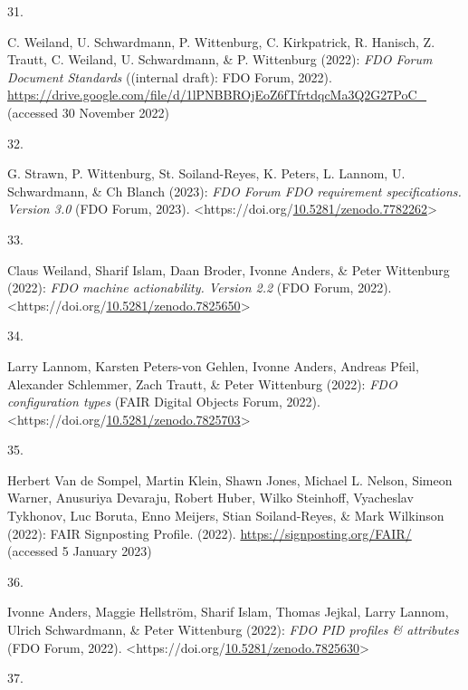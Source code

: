 \begin{thebibliography}{9}
\hypertarget{ref-fdo-DocProcessStd}{}
31.

C. Weiland, U. Schwardmann, P. Wittenburg, C. Kirkpatrick, R. Hanisch,
Z. Trautt, C. Weiland, U. Schwardmann, \& P. Wittenburg (2022):
\emph{{FDO Forum Document Standards}} ({(internal draft)}: {FDO Forum},
2022).
\url{https://drive.google.com/file/d/1lPNBBROjEoZ6fTfrtdqcMa3Q2G27PoC_}
(accessed 30 November 2022)

\hypertarget{ref-fdo-RequirementSpec}{}
32.

G. Strawn, P. Wittenburg, St. Soiland-Reyes, K. Peters, L. Lannom, U.
Schwardmann, \& Ch Blanch (2023): \emph{{FDO Forum FDO} requirement
specifications. Version 3.0} ({FDO Forum}, 2023).
\textless https://doi.org/\href{https://doi.org/10.5281/zenodo.7782262}{10.5281/zenodo.7782262}\textgreater{}

\hypertarget{ref-fdo-MachineActionDef}{}
33.

Claus Weiland, Sharif Islam, Daan Broder, Ivonne Anders, \& Peter
Wittenburg (2022): \emph{{FDO} machine actionability. Version 2.2} ({FDO
Forum}, 2022).
\textless https://doi.org/\href{https://doi.org/10.5281/zenodo.7825650}{10.5281/zenodo.7825650}\textgreater{}

\hypertarget{ref-fdo-ConfigurationTypes}{}
34.

Larry Lannom, Karsten Peters-von Gehlen, Ivonne Anders, Andreas Pfeil,
Alexander Schlemmer, Zach Trautt, \& Peter Wittenburg (2022):
\emph{{FDO} configuration types} ({FAIR Digital Objects Forum}, 2022).
\textless https://doi.org/\href{https://doi.org/10.5281/zenodo.7825703}{10.5281/zenodo.7825703}\textgreater{}

\hypertarget{ref-vandesompelFAIRSignpostingProfile2022}{}
35.

Herbert Van de Sompel, Martin Klein, Shawn Jones, Michael L. Nelson,
Simeon Warner, Anusuriya Devaraju, Robert Huber, Wilko Steinhoff,
Vyacheslav Tykhonov, Luc Boruta, Enno Meijers, Stian Soiland-Reyes, \&
Mark Wilkinson (2022): {FAIR Signposting Profile}. (2022).
\url{https://signposting.org/FAIR/} (accessed 5 January 2023)

\hypertarget{ref-fdo-PIDProfileAttributes}{}
36.

Ivonne Anders, Maggie Hellström, Sharif Islam, Thomas Jejkal, Larry
Lannom, Ulrich Schwardmann, \& Peter Wittenburg (2022): \emph{{FDO PID}
profiles \& attributes} ({FDO Forum}, 2022).
\textless https://doi.org/\href{https://doi.org/10.5281/zenodo.7825630}{10.5281/zenodo.7825630}\textgreater{}

\hypertarget{ref-weigelRDARecommendationPID2018}{}
37.


\end{thebibliography}
